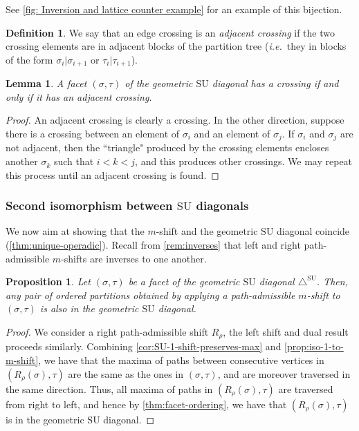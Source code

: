 \documentclass{amsart}
\newcommand{\darkblue}{\color{darkblue}} %
\newtheorem{proposition}[theorem]{Proposition}
\newtheorem{lemma}[theorem]{Lemma}
\theoremstyle{definition}
\newtheorem{definition}[theorem]{Definition}
\newcommand{\ie}{\textit{i.e.}~} %
\newcommand{\defn}[1]{\textsl{\darkblue #1}} %
\newcommand{\SU}{\mathrm{SU}}
\newcommand{\SUD}{\triangle^{\mathrm{SU}}}
\begin{document}
See \cref{fig: Inversion and lattice counter example} for an example of this bijection.

\begin{definition}
We say that an edge crossing is an \defn{adjacent crossing} if the two crossing elements are in adjacent blocks of the partition tree (\ie they in blocks of the form $\sigma_i|\sigma_{i+1}$ or $\tau_i|\tau_{i+1}$).
\end{definition}

\begin{lemma}
\label{lem:adjacent-crossing}
A facet $(\sigma,\tau)$ of the geometric $\SU$ diagonal has a crossing if and only if it has an adjacent crossing.
\end{lemma}

\begin{proof}
An adjacent crossing is clearly a crossing. 
In the other direction, suppose there is a crossing between an element of $\sigma_i$ and an element of $\sigma_j$. 
If $\sigma_i$ and $\sigma_j$ are not adjacent, then the ``triangle" produced by the crossing elements encloses another $\sigma_k$ such that $i<k<j$, and this produces other crossings. We may repeat this process until an adjacent crossing is found.
\end{proof}




\subsubsection{Second isomorphism between $\SU$ diagonals}
\label{sec:Iso m-shifts to IJ}

We now aim at showing that the $m$-shift and the geometric $\SU$ diagonal coincide (\cref{thm:unique-operadic}).
Recall from \cref{rem:inverses} that left and right path-admissible $m$-shifts are inverses to one another. 

\begin{proposition} 
\label{lem:IJ-closed-under-shifts}
Let $(\sigma,\tau)$ be a facet of the geometric $\SU$ diagonal $\SUD$.
Then, any pair of ordered partitions obtained by applying a path-admissible $m$-shift to $(\sigma,\tau)$ is also in the geometric $\SU$ diagonal.
\end{proposition}

\begin{proof}
We consider a right path-admissible shift $R_\rho$, the left shift and dual result proceeds similarly. 
Combining \cref{cor:SU-1-shift-preserves-max} and \cref{prop:iso-1-to-m-shift}, we have that the maxima of paths between consecutive vertices in $(R_{\rho}(\sigma),\tau)$ are the same as the ones in $(\sigma,\tau)$, and are moreover traversed in the same direction.
Thus, all maxima of paths in $(R_{\rho}(\sigma),\tau)$ are traversed from right to left, and hence by \cref{thm:facet-ordering}, we have that $(R_{\rho}(\sigma),\tau)$ is in the geometric $\SU$ diagonal.
\end{proof}
\end{document}
